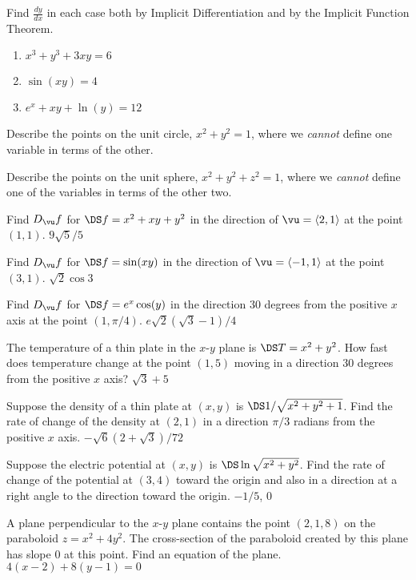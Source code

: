 \begin{multicols}{2}
\problem Find $\frac{dy}{dx}$ in each case both by Implicit %
Differentiation and by the Implicit Function Theorem.

\begin{enumerate}
\item $x^3+y^3+3xy=6$
\item $\sin(xy)=4$
\item $e^{x}+xy+\ln(y)=12$
\end{enumerate}

\problem Describe the points on the unit circle, $x^2+y^2=1$, where we %
{\em cannot\/} define one variable in terms of the other.

\problem Describe the points on the unit sphere, $x^2+y^2+z^2=1$, where %
we {\em cannot} define one of the variables in terms of the other two.





\problem Find $D_\vu f$ for $\DS f=x^2+xy+y^2$ in the direction of $\vu %
=\langle 2,1\rangle$ at the point $(1,1)$.  \answer $9\sqrt5/5$
\endanswer

\problem Find $D_\vu f$ for $\DS f=\sin(xy)$ in the direction of $\vu %
=\langle -1,1\rangle$ at the point $(3,1)$.  \answer $\sqrt2\cos3$
\endanswer

\problem Find $D_\vu f$ for $\DS f=e^x\cos(y)$ in the direction 30 degrees %
from the positive $x$ axis at the point $(1,\pi/4)$.  \answer
$e\sqrt2(\sqrt3-1)/4$
\endanswer

\problem The temperature of a thin plate in the $x$-$y$ plane is $\DS %
T=x^2+y^2$. How fast does temperature change at the point $(1,5)$ moving in
a direction 30 degrees from the positive $x$ axis?  \answer $\sqrt3+5$
\endanswer

\problem Suppose the density of a thin plate at $(x,y)$ is $\DS %
1/\sqrt{x^2+y^2+1}$. Find the rate of change of the density at $(2,1)$ in a
direction $\pi/3$ radians from the positive $x$ axis.  \answer
$-\sqrt6(2+\sqrt3)/72$
\endanswer

\problem Suppose the electric potential at $(x,y)$ is %
$\DS\ln\sqrt{x^2+y^2}$. Find the rate of change of the potential at $(3,4)$
toward the origin and also in a direction at a right angle to the direction
toward the origin.
\answer $-1/5$, $0$
\endanswer

\problem A plane perpendicular to the $x$-$y$ plane contains the point %
$(2,1,8)$ on the paraboloid $z=x^2+4y^2$. The cross-section of the
paraboloid created by this plane has slope 0 at this point. Find an
equation of the plane.  \answer $4(x-2)+8(y-1)=0$
\endanswer


\end{multicols}
